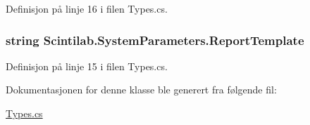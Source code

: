 Definisjon på linje 16 i filen Types.\+cs.

\hypertarget{class_scintilab_1_1_system_parameters_adc1b210a3c245e37f64147c8532cc041}{
\subsubsection[{Report\+Template}]{\setlength{\rightskip}{0pt plus 5cm}string Scintilab.\+System\+Parameters.\+Report\+Template}}\label{class_scintilab_1_1_system_parameters_adc1b210a3c245e37f64147c8532cc041}


Definisjon på linje 15 i filen Types.\+cs.



Dokumentasjonen for denne klasse ble generert fra følgende fil\+:\begin{DoxyCompactItemize}
\item 
\hyperlink{_types_8cs}{Types.\+cs}\end{DoxyCompactItemize}
